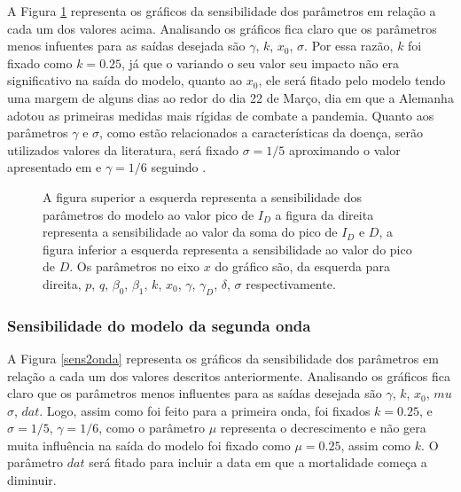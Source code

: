 \documentclass[12pt]{article}
\begin{document}
A Figura \ref{sens1onda} representa os gráficos da sensibilidade dos parâmetros em relação a cada um dos valores acima. Analisando os gráficos fica claro que os parâmetros menos infuentes para as saídas desejada são $\gamma$, $k$, $x_0$, $\sigma$. Por essa razão, $k$ foi fixado como $k = 0.25$, já que o variando o seu valor seu impacto não era significativo na saída do modelo, quanto ao $x_0$, ele será fitado pelo modelo tendo uma margem de alguns dias ao redor do dia 22 de Março, dia em que a Alemanha adotou as primeiras medidas mais rígidas de combate a pandemia. Quanto aos parâmetros $\gamma$ e $\sigma$, como estão relacionados a características da doença, serão utilizados valores da literatura, será fixado $\sigma = 1/5$ aproximando o valor apresentado em \cite{li2020early} e $\gamma = 1/6$ seguindo \cite{barbarossa2020modeling}.
\begin{figure}[h!]
    
    
    
    
    \caption{A figura superior a esquerda representa a sensibilidade dos parâmetros do modelo ao valor pico de $I_D$ a figura da direita representa a sensibilidade ao valor da soma do pico de $I_D$ e $D$, a figura inferior a esquerda representa a sensibilidade ao valor do pico de $D$. Os parâmetros no eixo $x$ do gráfico são, da esquerda para direita, $p$, $q$, $\beta_0$, $\beta_1$, $k$, $x_0$, $\gamma$, $\gamma_D$, $\delta$, $\sigma$ respectivamente.}
    \label{sens1onda}
\end{figure}

\subsubsection{ Sensibilidade do modelo da segunda onda}

A Figura \ref{sens2onda} representa os gráficos da sensibilidade dos parâmetros em relação a cada um dos valores descritos anteriormente. Analisando os gráficos fica claro que os parâmetros menos influentes para as saídas desejada são $\gamma$, $k$, $x_0$, $mu$ $\sigma$, $dat$. Logo, assim como foi feito para a primeira onda, foi fixados $k = 0.25$, e $\sigma = 1/5$, $\gamma = 1/6$, como o parâmetro $\mu$ representa o decrescimento e  não gera muita influência na saída do modelo foi fixado como $\mu = 0.25$, assim como $k$. O parâmetro $dat$ será fitado para incluir a data em que a mortalidade começa a diminuir.
\end{document}
